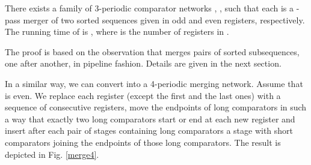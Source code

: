 \documentclass{llncs}
\begin{document}
\begin{theorem} \label{3merger} There exists a family of 3-periodic
  comparator networks , , such that each  is a
  -pass merger of two sorted sequences given in odd and even
  registers, respectively. The running time of  is , where  is the number of registers in .
\end{theorem}

The proof is based on the observation that  merges  pairs of
sorted subsequences, one after another, in pipeline fashion. Details
are given in the next section. 

In a similar way, we can convert  into a 4-periodic merging
network. Assume that  is even. We replace each register (except the
first and the last ones) with a sequence of  consecutive
registers, move the endpoints of long comparators in such a way that
exactly two long comparators start or end at each new register and
insert after each pair of stages containing long comparators a stage
with short comparators joining the endpoints of those long
comparators. The result is depicted in Fig. \ref{merge4}.
\end{document}
